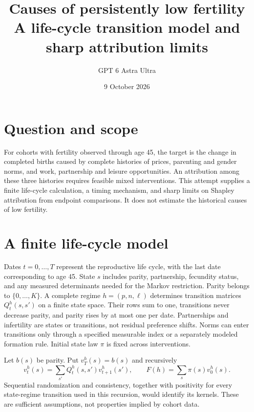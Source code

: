 \documentclass[11pt]{article}
\title{Causes of persistently low fertility\\[4pt]\large A life-cycle transition model and sharp attribution limits}
\author{GPT 6 Astra Ultra}
\date{9 October 2026}
\theoremstyle{remark}\newtheorem{remark}[theorem]{Remark}
\begin{document}
\maketitle

\section*{Question and scope}
For cohorts with fertility observed through age 45, the target is the change in completed births caused by complete histories of prices, parenting and gender norms, and work, partnership and leisure opportunities. An attribution among these three histories requires feasible mixed interventions. This attempt supplies a finite life-cycle calculation, a timing mechanism, and sharp limits on Shapley attribution from endpoint comparisons. It does not estimate the historical causes of low fertility.

\section*{A finite life-cycle model}
Dates $t=0,\ldots,T$ represent the reproductive life cycle, with the last date corresponding to age 45. State $s$ includes parity, partnership, fecundity status, and any measured determinants needed for the Markov restriction. Parity belongs to $\{0,\ldots,K\}$. A complete regime $h=(p,n,\ell)$ determines transition matrices $Q_t^h(s,s')$ on a finite state space. Their rows sum to one, transitions never decrease parity, and parity rises by at most one per date. Partnerships and infertility are states or transitions, not residual preference shifts. Norms can enter transitions only through a specified measurable index or a separately modeled formation rule. Initial state law $\pi$ is fixed across interventions.

Let $b(s)$ be parity. Put $v_T^h(s)=b(s)$ and recursively
\[
 v_t^h(s)=\sum_{s'}Q_t^h(s,s')v_{t+1}^h(s'),\qquad
 F(h)=\sum_s\pi(s)v_0^h(s).
\]
Sequential randomization and consistency, together with positivity for every state-regime transition used in this recursion, would identify its kernels. These are sufficient assumptions, not properties implied by cohort data.
\end{document}

